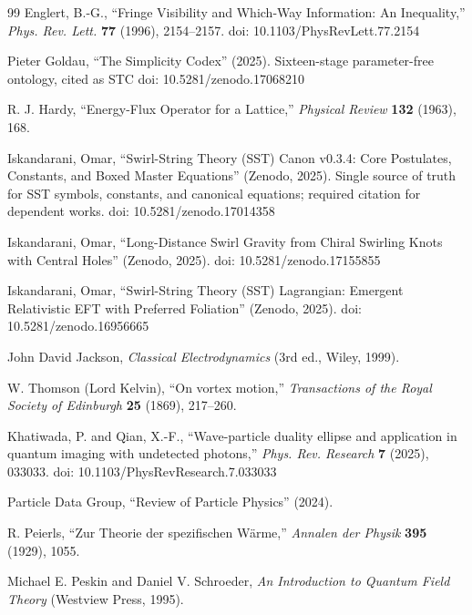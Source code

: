 \begin{thebibliography}{99}
    Englert, B.-G.,
    ``Fringe Visibility and Which-Way Information: An Inequality,''
    \textit{Phys. Rev. Lett.}
    \textbf{77}
    (1996), 2154--2157.
    doi: 10.1103/PhysRevLett.77.2154

    Pieter Goldau,
    ``The Simplicity Codex''
    (2025).
    Sixteen-stage parameter-free ontology, cited as STC
    doi: 10.5281/zenodo.17068210

    R. J. Hardy,
    ``Energy-Flux Operator for a Lattice,''
    \textit{Physical Review}
    \textbf{132}
    (1963), 168.

    Iskandarani, Omar,
    ``Swirl-String Theory (SST) Canon v0.3.4: Core Postulates, Constants, and Boxed Master Equations''
    (Zenodo, 2025).
    Single source of truth for SST symbols, constants, and canonical equations; required citation for dependent works.
    doi: 10.5281/zenodo.17014358

    Iskandarani, Omar,
    ``Long-Distance Swirl Gravity from Chiral Swirling Knots with Central Holes''
    (Zenodo, 2025).
    doi: 10.5281/zenodo.17155855

    Iskandarani, Omar,
    ``Swirl-String Theory (SST) Lagrangian: Emergent Relativistic EFT with Preferred Foliation''
    (Zenodo, 2025).
    doi: 10.5281/zenodo.16956665

    John David Jackson,
    \textit{Classical Electrodynamics}
    (3rd ed.,
    Wiley, 1999).

    W. Thomson (Lord Kelvin),
    ``On vortex motion,''
    \textit{Transactions of the Royal Society of Edinburgh}
    \textbf{25}
    (1869), 217--260.

    Khatiwada, P. and Qian, X.-F.,
    ``Wave-particle duality ellipse and application in quantum imaging with undetected photons,''
    \textit{Phys. Rev. Research}
    \textbf{7}
    (2025), 033033.
    doi: 10.1103/PhysRevResearch.7.033033

    Particle Data Group,
    ``Review of Particle Physics''
    (2024).

    R. Peierls,
    ``Zur Theorie der spezifischen Wärme,''
    \textit{Annalen der Physik}
    \textbf{395}
    (1929), 1055.

    Michael E. Peskin and Daniel V. Schroeder,
    \textit{An Introduction to Quantum Field Theory}
    (Westview Press, 1995).


\end{thebibliography}
